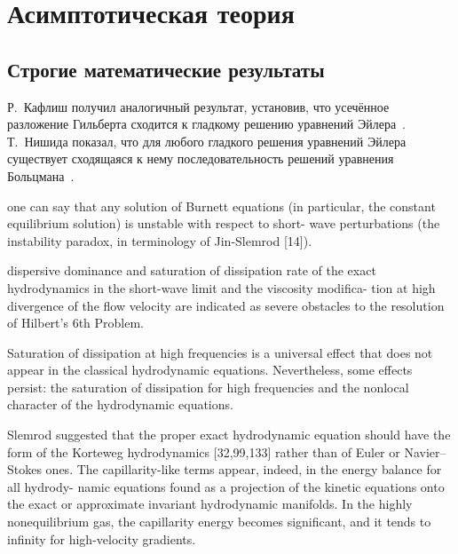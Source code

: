 \section{Асимптотическая теория} \label{sect:asymptotic}

\subsection{Строгие математические результаты}


Р.~Кафлиш получил аналогичный результат, установив, что усечённое разложение Гильберта
сходится к гладкому решению уравнений Эйлера~\cite{Caflisch1980limit}.
Т.~Нишида показал, что для любого гладкого решения уравнений Эйлера существует сходящаяся к нему
последовательность решений уравнения Больцмана~\cite{Nishida1978}.



one can say that any solution of Burnett equations (in particular, the constant equilibrium solution) is unstable with respect to short- wave perturbations (the instability paradox, in terminology of Jin-Slemrod [14]).

dispersive dominance and saturation of dissipation rate of the exact hydrodynamics in the short-wave limit and the viscosity modifica- tion at high divergence of the flow velocity are indicated as severe obstacles to the resolution of Hilbert’s 6th Problem.

Saturation of dissipation at high frequencies is a universal effect that does not appear in the classical hydrodynamic equations.
Nevertheless, some effects persist: the saturation of dissipation for high frequencies and the nonlocal character of the hydrodynamic equations.

Slemrod suggested that the proper exact hydrodynamic equation should have the form of the Korteweg hydrodynamics [32,99,133] rather than of Euler or Navier–Stokes ones.
The capillarity-like terms appear, indeed, in the energy balance for all hydrody- namic equations found as a projection of the kinetic equations onto the exact or approximate invariant hydrodynamic manifolds.
In the highly nonequilibrium gas, the capillarity energy becomes significant, and it tends to infinity for high-velocity gradients.

